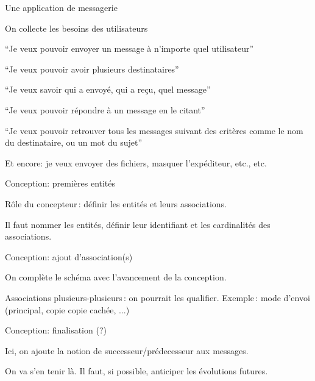 

\begin{frame}{Une application de messagerie}


On collecte les \alert{besoins} des utilisateurs 

\begin{redbullet}
  \item ``Je veux pouvoir envoyer un message à n'importe quel utilisateur'' 
   \item ``Je veux pouvoir avoir plusieurs destinataires''
  \item ``Je veux savoir qui a envoyé, qui a reçu, quel message''
  \item ``Je veux pouvoir répondre à un message en le citant''
  \item ``Je veux pouvoir retrouver tous les messages suivant des critères comme le 
    nom du destinataire, ou un mot du sujet''
\end{redbullet}


\vfill
Et encore: je veux envoyer des fichiers, masquer l'expéditeur, etc., etc.

\end{frame}

\begin{frame}{Conception: premières entités}

Rôle du concepteur\,: définir les entités et leurs associations.

\vfill



\vfill
\begin{blocgauche}
Il faut \alert{nommer} les entités, définir leur \alert{identifiant}
et les \alert{cardinalités} des associations.
\end{blocgauche}
\end{frame}


\begin{frame}{Conception: ajout d'association(s)}

On complète le schéma avec l'avancement de la conception.

\vfill



\vfill
Associations plusieurs-plusieurs\,: on pourrait 
les qualifier. Exemple\,: mode d'envoi (principal, copie
copie cachée, ...)
\end{frame}

\begin{frame}{Conception: finalisation (?) }

Ici, on ajoute la notion de successeur/prédecesseur aux messages.

\vfill

\vfill


\alert{On va s'en tenir là.} Il faut, si possible, anticiper
les évolutions futures.
\end{frame}


